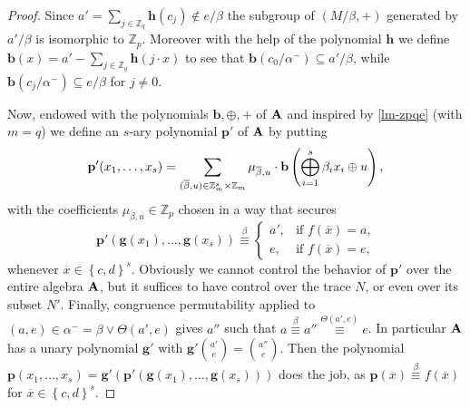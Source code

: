 \documentclass[11pt,a4paper]{amsart}
\newcommand{\m}[1]{{\uppercase {\bf{#1}}}}
\newcommand{\set}[1]{{\left\{ {#1} \right\} }}
\newcommand{\ci}{\subseteq}
\newcommand{\vpair}[2]{{{#1}\choose{#2}}}
\newcommand{\join}{\vee}
\newcommand{\po}[1]{{\mathbf {#1}}}
\renewcommand{\o}[1]{\overline {#1}}
\newcommand{\congruent}[1]{\stackrel{#1}{\equiv}}
\newcommand{\alpham}{\alpha^-}
\newcommand{\z}{\mathbb{Z}}
\begin{document}
\begin{proof}
Since $a'=\sum_{j\in \z_q} \po h(c_j)\not\in e/\beta$
the subgroup of $(M/\beta,+)$ generated by $a'/\beta$ is isomorphic to $\z_p$.
Moreover with the help of the polynomial $\po h$
we define $\po b(x)=a'-\sum_{j\in \z_q}\po h(j\cdot x)$
to see that $\po b(c_0/\alpham)\ci a'/\beta$, while $\po b(c_j/\alpham)\ci e/\beta$ for $j\neq 0$.


Now, endowed with the polynomials $\po b, \oplus, +$ of $\m A$
and inspired by \cref{lm-zpqe} (with $m=q$)
we define an $s$-ary polynomial $\po p'$ of $\m A$ by putting
\[
\po p'(x_1,\ldots,x_s)=\sum_{(\o\beta,u)\in\m \z_m^s\times\z_m}
\mu_{\o\beta,u}\cdot \po b\left(\bigoplus_{i=1}^s \beta_i x_i\oplus u\right),
\]
with the coefficients $\mu_{\o\beta,u}\in \z_p$ chosen in a way that secures
\begin{equation}
\label{eq-spike}
\po p'(\po g(x_1),\ldots,\po g(x_s))\congruent{\beta}
\left\{
\begin{array}{ll}
a', &\mbox{if $f(\o x)=a$,}\\
e,  &\mbox{if $f(\o x)=e$,}
\end{array}
\right.
\end{equation}
whenever $\o x\in \set{c,d}^s$.
Obviously we cannot control the behavior of $\po p'$ over the entire algebra $\m A$,
but it suffices to have control over the trace $N$, or even over its subset $N'$.
Finally, congruence permutability applied to $(a,e)\in \alpham = \beta\join\Theta(a',e)$
gives $a''$ such that
$a\congruent{\beta}a''\congruent{\Theta(a',e)}e$.
In particular $\m A$ has a unary polynomial $\po g'$ with $\po g'\vpair{a'}{e} = \vpair{a''}{e}$.
Then the polynomial
$\po p(x_1,\ldots,x_s) = \po g'(\po p'(\po g(x_1),\ldots,\po g(x_s)))$
does the job, as $\po p(\o x)\congruent{\beta}f(\o x)$ for $\o x\in\set{c,d}^s$.
\end{proof}
\end{document}
